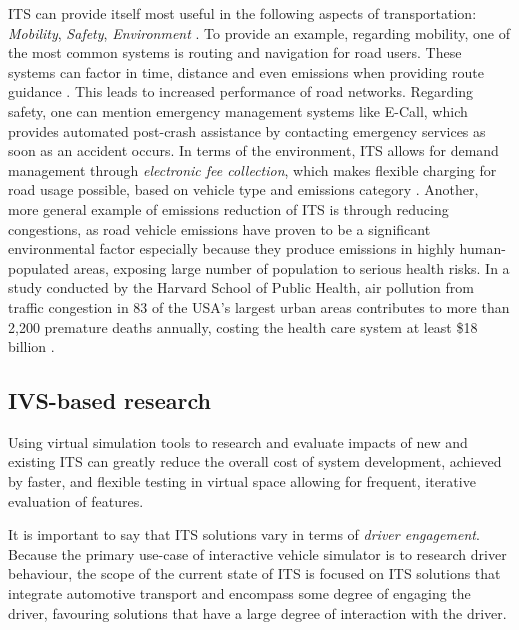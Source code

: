 \documentclass[main.tex]{subfiles}
\begin{document}
ITS can provide itself most useful in the following aspects of transportation: 
\emph{Mobility}, \emph{Safety}, \emph{Environment} \cite{Lishchenko2021}. To provide an example, regarding mobility, 
one of the most common systems is routing and navigation for road users. These systems can 
factor in time, distance and even emissions when providing route guidance \cite{Firmin2006}. This leads to 
increased performance of road networks. Regarding safety, one can mention emergency management
systems like E-Call, which provides automated post-crash assistance by contacting emergency
services as soon as an accident occurs. In terms of the environment, 
ITS allows for demand management through \emph{electronic fee collection}, which makes flexible 
charging for road usage possible, based on vehicle type and emissions category \cite{Commision2022}.
Another, more general example of emissions reduction of ITS is through reducing congestions, as road vehicle 
emissions have proven to be a significant environmental factor especially because they produce emissions 
in highly human-populated areas, exposing large number of population to serious health risks. In a study conducted by the Harvard
School of Public Health, air pollution from traffic congestion in 83 of the USA's largest urban
areas contributes to more than 2,200 premature deaths annually, costing the health care system at
least \$18 billion \cite{Levy2011}.

\subsection{IVS-based research}

Using virtual simulation tools to research and evaluate impacts of new and existing ITS 
can greatly reduce the overall cost of system development, achieved by faster, 
and flexible testing in virtual space allowing for frequent, iterative evaluation of features.

It is important to say that ITS solutions vary in terms of \emph{driver engagement}. Because
the primary use-case of interactive vehicle simulator is to research driver behaviour, the 
scope of the current state of ITS is focused on ITS solutions that integrate automotive 
transport and encompass some degree of engaging the driver, favouring solutions that have a large degree 
of interaction with the driver.
\end{document}
